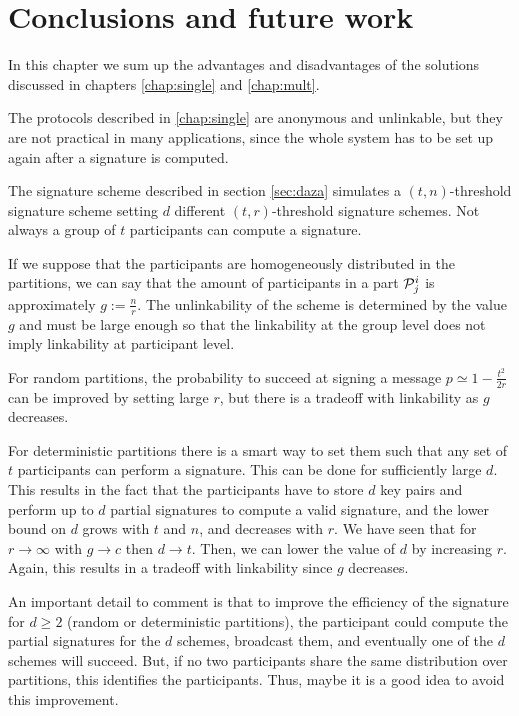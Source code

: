 \chapter{Conclusions and future work}
\label{chap:conc}
In this chapter we sum up the advantages and disadvantages of the solutions discussed in chapters \ref{chap:single} and \ref{chap:mult}.

The protocols described in \ref{chap:single} are anonymous and unlinkable, but they are not practical in many applications, since the whole system has to be set up again after a signature is computed.

The signature scheme described in section \ref{sec:daza} simulates a $(t,n)$-threshold signature scheme setting $d$ different $(t,r)$-threshold signature schemes. Not always a group of $t$ participants can compute a signature.

If we suppose that the participants are homogeneously distributed in the partitions, we can say that the amount of participants in a part ${\mathcal P}^i_j$ is approximately $g:=\frac{n}{r}$. The unlinkability of the scheme is determined by the value $g$ and must be large enough so that the linkability at the group level does not imply linkability at participant level.

For random partitions, the probability to succeed at signing a message $p \simeq 1 - \frac{t^2}{2r}$ can be improved by setting large $r$, but there is a tradeoff with linkability as $g$ decreases. 

For deterministic partitions there is a smart way to set them such that any set of $t$ participants can perform a signature. This can be done for sufficiently large $d$. This results in the fact that the participants have to store $d$ key pairs and perform up to $d$ partial signatures to compute a valid signature, and the lower bound on $d$ grows with $t$ and $n$, and decreases with $r$. We have seen that for $r \rightarrow \infty$ with $g \rightarrow c$ then $d \rightarrow t$. Then, we can lower the value of $d$ by increasing $r$. Again, this results in a tradeoff with linkability since $g$ decreases.

An important detail to comment is that to improve the efficiency of the signature for $d \geq 2$ (random or deterministic partitions), the participant could compute the partial signatures for the $d$ schemes, broadcast them, and eventually one of the $d$ schemes will succeed. But, if no two participants share the same distribution over partitions, this identifies the participants. Thus, maybe it is a good idea to avoid this improvement.

